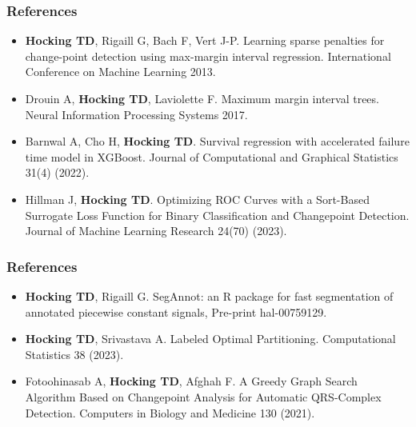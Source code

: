 \documentclass{beamer}
\begin{document}
\begin{frame}
  \frametitle{References}
  \scriptsize
  \begin{itemize}
  \item \textbf{Hocking TD}, Rigaill G, Bach F, Vert J-P. Learning
    sparse penalties for change-point detection using max-margin
    interval regression. International Conference on Machine Learning
    2013.
  \item Drouin A, \textbf{Hocking TD}, Laviolette F. Maximum margin interval
    trees. Neural Information Processing Systems 2017.
  \item Barnwal A, Cho H, \textbf{Hocking TD}. Survival regression with
    accelerated failure time model in XGBoost. Journal of Computational and Graphical Statistics 31(4) (2022).
  \item Hillman J, \textbf{Hocking TD}. Optimizing ROC Curves with a
    Sort-Based Surrogate Loss Function for Binary Classification and
    Changepoint Detection. Journal of Machine Learning Research 24(70)
    (2023).
  \end{itemize}
\end{frame}

\begin{frame}
  \frametitle{References}
  \scriptsize
  \begin{itemize}
  \item \textbf{Hocking TD}, Rigaill G. SegAnnot: an R package for
    fast segmentation of annotated piecewise constant signals,
    Pre-print hal-00759129.
  \item \textbf{Hocking TD}, Srivastava A. Labeled Optimal
    Partitioning. Computational Statistics 38 (2023).
  \item Fotoohinasab A, \textbf{Hocking TD}, Afghah F. A Greedy Graph
    Search Algorithm Based on Changepoint Analysis for Automatic
    QRS-Complex Detection. Computers in Biology and Medicine 130
    (2021).
  \end{itemize}
\end{frame}

\end{document}
